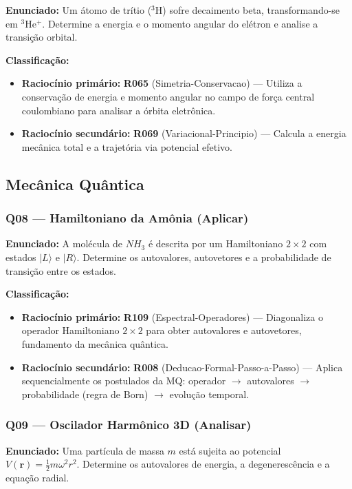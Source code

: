 \documentclass[12pt,a4paper]{article}
\newcommand{\rcode}[1]{\textcolor{azulprof}{\textbf{#1}}}
\newcommand{\bloom}[1]{\textcolor{verdeexame}{\textbf{#1}}}
\begin{document}
\textbf{Enunciado:} Um átomo de trítio ($^3$H) sofre decaimento beta,
transformando-se em $^3$He$^+$. Determine a energia e o momento angular
do elétron e analise a transição orbital.

\medskip
\noindent\textbf{Classificação:}
\begin{itemize}
  \item \textbf{Raciocínio primário:} \rcode{R065} (Simetria-Conservacao) ---
    Utiliza a conservação de energia e momento angular no campo de força
    central coulombiano para analisar a órbita eletrônica.
  \item \textbf{Raciocínio secundário:} \rcode{R069} (Variacional-Principio) ---
    Calcula a energia mecânica total e a trajetória via potencial efetivo.
\end{itemize}

\subsection{Mecânica Quântica}

\subsubsection{Q08 --- Hamiltoniano da Amônia (\bloom{Aplicar})}

\textbf{Enunciado:} A molécula de $NH_3$ é descrita por um Hamiltoniano
$2\times2$ com estados $|L\rangle$ e $|R\rangle$. Determine os autovalores,
autovetores e a probabilidade de transição entre os estados.

\medskip
\noindent\textbf{Classificação:}
\begin{itemize}
  \item \textbf{Raciocínio primário:} \rcode{R109} (Espectral-Operadores) ---
    Diagonaliza o operador Hamiltoniano $2\times2$ para obter autovalores
    e autovetores, fundamento da mecânica quântica.
  \item \textbf{Raciocínio secundário:} \rcode{R008} (Deducao-Formal-Passo-a-Passo) ---
    Aplica sequencialmente os postulados da MQ: operador $\to$ autovalores
    $\to$ probabilidade (regra de Born) $\to$ evolução temporal.
\end{itemize}

\subsubsection{Q09 --- Oscilador Harmônico 3D (\bloom{Analisar})}

\textbf{Enunciado:} Uma partícula de massa $m$ está sujeita ao potencial
$V(\mathbf{r}) = \frac{1}{2}m\omega^2 r^2$. Determine os autovalores de
energia, a degenerescência e a equação radial.
\end{document}
